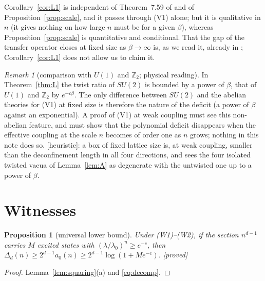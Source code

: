 \documentclass[11pt,a4paper]{article}
\theoremstyle{plain}
\newtheorem{proposition}[theorem]{Proposition}
\theoremstyle{definition}
\theoremstyle{remark}
\newtheorem{remark}[theorem]{Remark}
\numberwithin{equation}{section}
\newcommand{\Z}{\mathbb{Z}}
\newcommand{\st}[1]{\textsf{[#1]}}
\begin{document}
Corollary~\ref{cor:L1} is independent of Theorem~7.59 of \cite{BB26v5} and of Proposition~\ref{prop:scale}, and it passes through (V1) alone; but it is qualitative in $n$ (it gives nothing on how large $n$ must be for a given $\beta$), whereas Proposition~\ref{prop:scale} is quantitative and conditional. That the gap of the transfer operator closes at fixed size as $\beta\to\infty$ is, as we read it, already in \cite{BB26v5}; Corollary~\ref{cor:L1} does not allow us to claim it.

\begin{remark}[comparison with $U(1)$ and $\Z_2$; physical reading]\label{rem:L-comparison}
In Theorem~\ref{thm:L} the twist ratio of $SU(2)$ is bounded by a power of $\beta$, that of $U(1)$ and $\Z_2$ by $e^{-c\beta}$. The only difference between $SU(2)$ and the abelian theories for (V1) at fixed size is therefore the nature of the deficit (a power of $\beta$ against an exponential). A proof of (V1) at weak coupling must see this non-abelian feature, and must show that the polynomial deficit disappears when the effective coupling at the scale $n$ becomes of order one as $n$ grows; nothing in this note does so. \st{heuristic}: a box of fixed lattice size is, at weak coupling, smaller than the deconfinement length in all four directions, and sees the four isolated twisted vacua of Lemma~\ref{lem:A} as degenerate with the untwisted one up to a power of $\beta$.
\end{remark}

\section{Witnesses}\label{sec:witness}

\begin{proposition}[universal lower bound]\label{prop:lower}
Under (W1)--(W2), if the section $n^{d-1}$ carries $M$ excited states with $(\lambda/\lambda_0)^n\ge e^{-c}$, then
$\Delta_d(n)\ge2^{d-1}a_0(n)\ge2^{d-1}\log(1+Me^{-c})$. \st{proved}
\end{proposition}
\begin{proof}
Lemma~\ref{lem:squaring}(a) and \eqref{eq:decomp}.
\end{proof}
\end{document}
